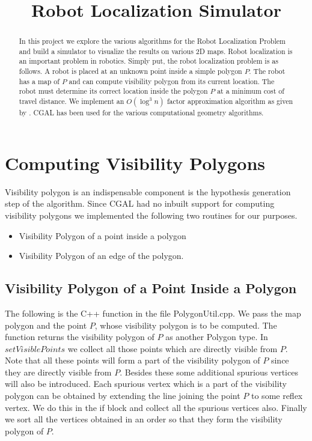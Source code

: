 \documentclass[a4paper,10pt]{article}
\title{Robot Localization Simulator}
\author{}
\begin{document}
\maketitle

\begin{abstract}
In this project we explore the various algorithms for the Robot Localization Problem and build a simulator to visualize the results on
various 2D maps.
Robot localization is an important problem in robotics. Simply put, the robot localization problem is as follows. A robot is 
placed at an unknown point inside a simple polygon $ P $. The robot has a map of 
$ P$ and can compute visibility polygon from its current location. The robot must determine its correct 
location inside the polygon $P $ at a minimum cost of travel distance. We implement an ${O(\log^3 n)} $ factor approximation algorithm 
as given by \cite{key1}. CGAL \cite{key2} has been used for the various computational geometry algorithms.

\end{abstract}

\newpage

\section{Computing Visibility Polygons}
Visibility polygon is an indispensable component is the hypothesis generation step of the algorithm. Since CGAL had no inbuilt support
 for computing visibility polygons we implemented the following two routines for our purposes.
\begin{itemize}
 \item Visibility Polygon of a point inside a polygon
 \item Visibility Polygon of an edge of the polygon.
\end{itemize}

\subsection{Visibility Polygon of a Point Inside a Polygon}

The following is the C++ function in the file PolygonUtil.cpp. We pass the map polygon and the point $P$, whose visibility polygon is to be
 computed. The function returns the visibility polygon of $P$ as another Polygon type.
In $setVisiblePoints$ we collect all those points which are directly visible from $P$. Note that
 all these points will form a part of the visibility polygon of $P$ since they are directly visible from $P$. 
Besides these some additional spurious vertices will also be introduced. Each spurious vertex which is a part of the visibility polygon
 can be obtained by extending the line joining the point $P$ to some reflex vertex. We do this in the if block and collect all the 
spurious vertices also. Finally we sort all the vertices obtained in an order so that they form the visibility polygon of $P$.
\end{document}
